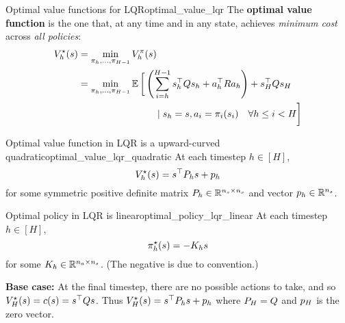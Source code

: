 \documentclass[\main/main]{subfiles}
\begin{document}
\begin{definition}[breakable=false]{Optimal value functions for LQR}{optimal_value_lqr}
    The \textbf{optimal value function} is the one that, at any time and in any state,
    achieves \emph{minimum cost} across \emph{all policies}: \[
        \begin{split}
            V^\star_h(s) &= \min_{\pi_h, \dots, \pi_{H-1}} V^\pi_h(s) \\
            &= \min_{\pi_{h}, \dots, \pi_{H-1}} \operatorname*{\mathbb{E}} \bigg[ \left( \sum_{i=h}^{H-1} s_h^\top Q s_h + a_h^\top R a_h \right) + s_H^\top Q s_H \\
                &\hspace{8em} \mid s_h = s, a_i = \pi_i(s_i) \quad \forall h \le i < H \bigg] \\
        \end{split}
    \]
\end{definition}

\begin{theorem}{Optimal value function in LQR is a upward-curved quadratic}{optimal_value_lqr_quadratic}
    At each timestep $h \in [H]$,
    \[
        V^\star_h(s) = s^\top P_h s + p_h
    \]
    for some symmetric positive definite matrix $P_h \in \mathbb{R}^{n_s \times n_s}$ and vector $p_h \in \mathbb{R}^{n_s}$.
\end{theorem}

\begin{theorem}{Optimal policy in LQR is linear}{optimal_policy_lqr_linear}
    At each timestep $h \in [H]$,
    \[
        \pi^\star_h (s) = - K_h s
    \]
    for some $K_h \in \mathbb{R}^{n_a \times n_s}$. (The negative is due to convention.)
\end{theorem}





\textbf{Base case:} At the final timestep, there are no possible actions to take, and so $V^\star_H(s) = c(s) = s^\top Q s$. Thus $V_H^\star(s) = s^\top P_h s + p_h$ where $P_H = Q$ and $p_H$ is the zero vector.
\end{document}
